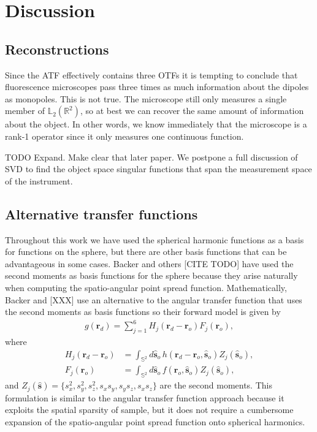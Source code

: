 \documentclass[]{osa-article}
\providecommand{\ro}{\mathbf{\mathbf{r}}_o}
\providecommand{\so}{\mathbf{\hat{s}}_o}
\providecommand{\rd}{\mathbf{r}_d}
\providecommand{\mh}[1]{\mathbf{\hat{#1}}}
\providecommand{\mbb}[1]{\mathbb{#1}}
\begin{document}
 
\section{Discussion}\label{sec:discussion}
\subsection{Reconstructions}
Since the ATF effectively contains three OTFs it is tempting to conclude that
fluorescence microscopes pass three times as much information about the dipoles
as monopoles. This is not true. The microscope still only measures a single
member of $\mbb{L}_2(\mbb{R}^2)$, so at best we can recover the same amount of
information about the object. In other words, we know immediately that the
microscope is a rank-1 operator since it only measures one continuous function.

TODO Expand. Make clear that later paper. We postpone a full discussion of SVD to find the object space singular functions
that span the measurement space of the instrument.

\subsection{Alternative transfer functions}
Throughout this work we have used the spherical harmonic functions as a basis
for functions on the sphere, but there are other basis functions that can be
advantageous in some cases. Backer and others [CITE TODO] have used the second
moments as basis functions for the sphere because they arise naturally when
computing the spatio-angular point spread function. Mathematically, Backer and
[XXX] use an alternative to the angular transfer function that uses the second
moments as basis functions so their forward model is given by
\begin{align}
  g(\rd) = \sum_{j=1}^6 H_j(\rd - \ro)F_j(\ro),
\end{align}
where
\begin{align}
  H_j(\rd - \ro) &= \int_{\mbb{S}^2}d\so\, h(\rd - \ro, \so)Z_j(\so),\\
  F_j(\ro) &= \int_{\mbb{S}^2}d\so\, f(\ro, \so)Z_j(\so),
\end{align}
and $Z_j(\mh{s}) = \{s_x^2, s_y^2, s_z^2, s_xs_y, s_ys_z, s_xs_z\}$ are the
second moments. This formulation is similar to the angular transfer function
approach because it exploits the spatial sparsity of sample, but it does not
require a cumbersome expansion of the spatio-angular point spread function onto
spherical harmonics.
\end{document}
